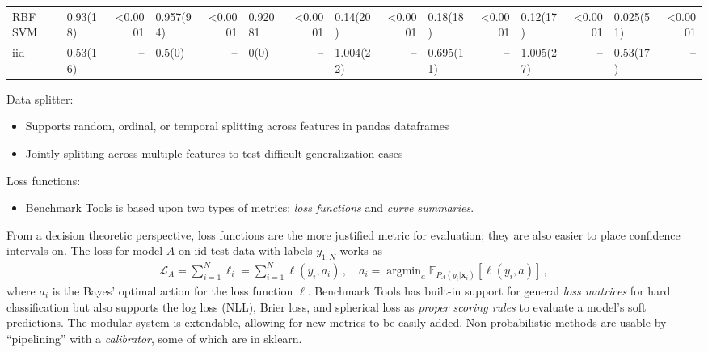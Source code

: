 \documentclass[a0,landscape]{a0poster}
\renewcommand{\vec}[1]{{\boldsymbol{\mathbf{#1}}}} %
\newcommand{\E}{\mathbb{E}}
\newcommand{\Loss}{\mathcal{L}}
\newcommand{\loss}{\ell}
\DeclareMathOperator*{\argmin}{argmin}
\begin{document}
\begin{multicols}{3}
\begin{center}
{\begin{tabular}{|l|l|r|l|r|l|r|l|r|l|r|l|r|l|r|}
RBF SVM           &  0.93(18)  &  <0.0001 &  0.957(94) &  <0.0001 &  0.92081 &  <0.0001 &  0.14(20)  &  <0.0001 &    0.18(18)  &  <0.0001 &  0.12(17)  &  <0.0001 &  0.025(51) &  <0.0001 \\
iid               &  0.53(16)  &     {--} &  0.5(0)    &     {--} &  0(0)    &     {--} &  1.004(22) &     {--} &    0.695(11) &     {--} &  1.005(27) &     {--} &  0.53(17)  &     {--} \\
\bottomrule
\end{tabular}
}
\end{center}

Data splitter:
\begin{itemize}
  \item Supports random, ordinal, or temporal splitting across features in pandas dataframes
  \item Jointly splitting across multiple features to test difficult generalization cases
\end{itemize}

Loss functions:
\begin{itemize}
\item Benchmark Tools is based upon two types of metrics: \emph{loss functions} and \emph{curve summaries}.
\end{itemize}
From a decision theoretic perspective, loss functions are the more justified metric for evaluation; they are also easier to place confidence intervals on.
The loss for model $A$ on iid test data with labels $y_{1:N}$ works as
\begin{align}
  \Loss_A = \sum_{i=1}^N \loss_i = \sum_{i=1}^N \loss(y_i, a_i)\,, \quad a_i = \argmin_a \E_{P_A(y_i|\vec x_i)}[\loss(y_i, a)]\,,
\end{align}
where $a_i$ is the Bayes' optimal action for the loss function $\loss$.
Benchmark Tools has built-in support for general \emph{loss matrices} for hard classification but also supports the log loss (NLL), Brier loss, and spherical loss as \emph{proper scoring rules} to evaluate a model's soft predictions.
The modular system is extendable, allowing for new metrics to be easily added.
Non-probabilistic methods are usable by ``pipelining'' with a \emph{calibrator}, some of which are in sklearn.


\end{multicols}
\end{document}
